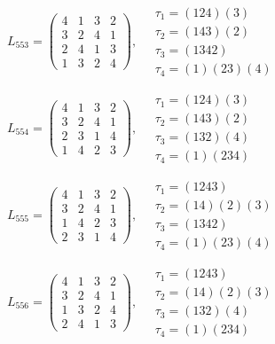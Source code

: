 $L_{553} = \begin{pmatrix} 4 & 1 & 3 & 2 \\ 3 & 2 & 4 & 1 \\ 2 & 4 & 1 & 3 \\ 1 & 3 & 2 & 4 \end{pmatrix}, \quad \begin{matrix} \tau_{1} = (1 2 4)(3) \\ \tau_{2} = (1 4 3)(2) \\ \tau_{3} = (1 3 4 2) \\ \tau_{4} = (1)(2 3)(4) \end{matrix}$

$L_{554} = \begin{pmatrix} 4 & 1 & 3 & 2 \\ 3 & 2 & 4 & 1 \\ 2 & 3 & 1 & 4 \\ 1 & 4 & 2 & 3 \end{pmatrix}, \quad \begin{matrix} \tau_{1} = (1 2 4)(3) \\ \tau_{2} = (1 4 3)(2) \\ \tau_{3} = (1 3 2)(4) \\ \tau_{4} = (1)(2 3 4) \end{matrix}$

$L_{555} = \begin{pmatrix} 4 & 1 & 3 & 2 \\ 3 & 2 & 4 & 1 \\ 1 & 4 & 2 & 3 \\ 2 & 3 & 1 & 4 \end{pmatrix}, \quad \begin{matrix} \tau_{1} = (1 2 4 3) \\ \tau_{2} = (1 4)(2)(3) \\ \tau_{3} = (1 3 4 2) \\ \tau_{4} = (1)(2 3)(4) \end{matrix}$

$L_{556} = \begin{pmatrix} 4 & 1 & 3 & 2 \\ 3 & 2 & 4 & 1 \\ 1 & 3 & 2 & 4 \\ 2 & 4 & 1 & 3 \end{pmatrix}, \quad \begin{matrix} \tau_{1} = (1 2 4 3) \\ \tau_{2} = (1 4)(2)(3) \\ \tau_{3} = (1 3 2)(4) \\ \tau_{4} = (1)(2 3 4) \end{matrix}$

